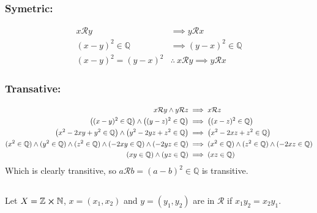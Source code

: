 \documentclass[]{article}
\newcommand{\Rel}{\mathcal{R}}
\newcommand{\N}{\mathbb{N}}
\newcommand{\Z}{\mathbb{Z}}
\newcommand{\Q}{\mathbb{Q}}
\begin{document}
\subsubsection{Symetric:}
\begin{align*}
	x \Rel y
		&\implies y \Rel x\\
	(x - y)^2 \in \Q
		&\implies (y-x)^2 \in \Q\\
	(x-y)^2 = (y-x)^2
		&\therefore \ x \Rel y \implies y \Rel x
\end{align*}

\subsubsection{Transative:}
\begin{align*}
	x \Rel y \land y \Rel z
		&\implies x \Rel z\\
	\qty((x - y)^2 \in \Q) \land \qty((y - z)^2 \in \Q)
		&\implies \qty((x-z)^2 \in \Q)\\
	\qty(x^2 - 2xy + y^2 \in \Q) \land \qty(y^2 - 2yz + z^2 \in \Q)
		&\implies \qty(x^2 - 2xz + z^2\in \Q)\\
	(x^2 \in \Q) \land (y^2 \in \Q) \land (z^2 \in \Q) \land (-2xy \in \Q) \land (-2yz \in \Q)
		&\implies (x^2 \in \Q) \land (z^2 \in \Q) \land (-2xz \in \Q)\\
	(xy \in \Q) \land (yz \in \Q)
		&\implies (xz \in \Q)
\end{align*}
Which is clearly transitive, so $a \Rel b = (a-b)^2 \in \Q$ is transitive.

\subsection{}
Let $X = \Z \cross \N$,
$x = (x_1, x_2)$ and $y = (y_1, y_2)$
are in $\Rel$ if $x_1 y_2 = x_2 y_1$.
















\newpage
\section{}
\end{document}
